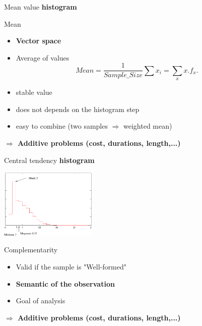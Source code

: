 \documentclass[xcolor=x11names,compress,8pt,
]{beamer}
\renewcommand{\(}{\begin{columns}}
\renewcommand{\)}{\end{columns}}
\newcommand{\<}[1]{\begin{column}{#1}}
\renewcommand{\>}{\end{column}}
\begin{document}
\begin{frame}{Mean value}
{\bf histogram}
\begin{center}
\end{center}
\begin{block}{Mean}
\begin{itemize}
\item {\textcolor{Green4}{\bf Vector space}}
\item Average of values 
\[
Mean = \frac 1 {Sample\_Size}\sum x_i = \sum_{x}x.f_x .\]
\item stable value 
\item does not depends on the histogram step 
\item easy to combine (two samples $\Rightarrow$ weighted mean)
\end{itemize}


\alert{\bf $\Longrightarrow$ Additive problems (cost, durations, length,...)} 

\end{block}
\end{frame}
\begin{frame}{Central tendency}
{\bf histogram}
\begin{center}
\includegraphics[width=4.6cm]{histogramme2.pdf}
\end{center}
\begin{block}{Complementarity}
\begin{itemize}
\item Valid if the sample is "Well-formed"
\item {\textcolor{Green4}{\bf Semantic of the observation}}
\item Goal of analysis 
\end{itemize}

\alert{\bf $\Longrightarrow$ Additive problems (cost, durations, length,...)} 

\end{block}
\end{frame}
\end{document}
